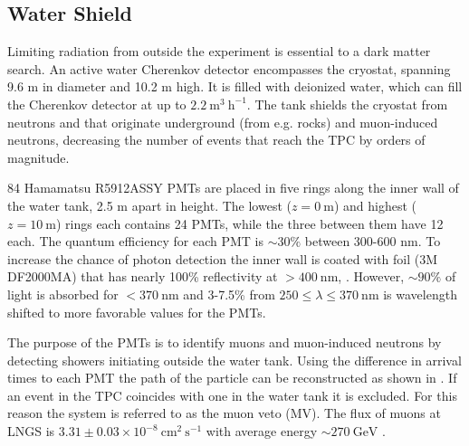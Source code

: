 \subsection{Water Shield}
\label{subsec:xenon1t_water_shield}
Limiting radiation from outside the experiment is essential to a dark matter search.  An active water Cherenkov detector encompasses the
cryostat, spanning 9.6 m in diameter and 10.2 m high.  It is filled with deionized water, which can fill the Cherenkov detector at up to
$2.2\ \mathrm{m^{3}\ h^{-1}}$.  The tank shields the cryostat from neutrons and \gammarays that originate underground (from e.g. rocks)
and muon-induced neutrons, decreasing the number of events that reach the TPC by orders of magnitude.

84 Hamamatsu R5912ASSY PMTs are placed in five rings along the inner wall of the water tank, 2.5 m apart in height.  The lowest
($z = 0\ \mathrm{m}$) and highest ($z = 10\ \mathrm{m}$) rings each contains 24 PMTs, while the three between them have 12 each.  The
quantum efficiency for each PMT is ${\sim}30\%$ between 300-600 nm.  To increase the chance of photon detection the inner wall is coated
with foil (3M DF2000MA) that has
nearly 100\% reflectivity at $> 400\ \mathrm{nm}$, .  However, ${\sim}90\%$ of light is absorbed for
$<370\ \mathrm{nm}$ and 3-7.5\% from $250 \leq \lambda \leq 370\ \mathrm{nm}$ is wavelength shifted to more favorable values for the PMTs.

The purpose of the PMTs is to identify muons and muon-induced neutrons by detecting showers initiating
outside the water tank.  Using the difference in arrival times to each PMT the path of the particle can be reconstructed as shown in
.  If an event in the TPC coincides with one in the water tank it is excluded.  For this reason
the system is referred to as the muon veto (MV).  The flux of muons at LNGS is $3.31 \pm 0.03 \times 10^{-8}\ \mathrm{cm^2\ s^{-1}}$ with
average energy ${\sim}270\ \mathrm{GeV}$ .

